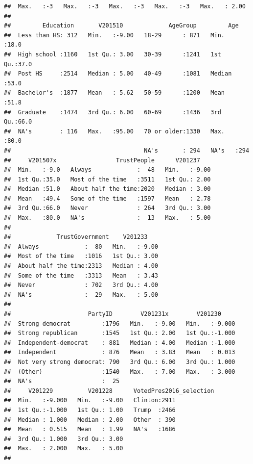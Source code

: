 \documentclass[
]{krantz}
\begin{document}
\begin{verbatim}
##  Max.   :-3   Max.   :-3   Max.   :-3   Max.   :-3   Max.   : 2.00  
##                                                                     
##         Education       V201510             AgeGroup         Age      
##  Less than HS: 312   Min.   :-9.00   18-29      : 871   Min.   :18.0  
##  High school :1160   1st Qu.: 3.00   30-39      :1241   1st Qu.:37.0  
##  Post HS     :2514   Median : 5.00   40-49      :1081   Median :53.0  
##  Bachelor's  :1877   Mean   : 5.62   50-59      :1200   Mean   :51.8  
##  Graduate    :1474   3rd Qu.: 6.00   60-69      :1436   3rd Qu.:66.0  
##  NA's        : 116   Max.   :95.00   70 or older:1330   Max.   :80.0  
##                                      NA's       : 294   NA's   :294   
##     V201507x                 TrustPeople      V201237     
##  Min.   :-9.0   Always             :  48   Min.   :-9.00  
##  1st Qu.:35.0   Most of the time   :3511   1st Qu.: 2.00  
##  Median :51.0   About half the time:2020   Median : 3.00  
##  Mean   :49.4   Some of the time   :1597   Mean   : 2.78  
##  3rd Qu.:66.0   Never              : 264   3rd Qu.: 3.00  
##  Max.   :80.0   NA's               :  13   Max.   : 5.00  
##                                                           
##             TrustGovernment    V201233     
##  Always             :  80   Min.   :-9.00  
##  Most of the time   :1016   1st Qu.: 3.00  
##  About half the time:2313   Median : 4.00  
##  Some of the time   :3313   Mean   : 3.43  
##  Never              : 702   3rd Qu.: 4.00  
##  NA's               :  29   Max.   : 5.00  
##                                            
##                      PartyID        V201231x        V201230      
##  Strong democrat         :1796   Min.   :-9.00   Min.   :-9.000  
##  Strong republican       :1545   1st Qu.: 2.00   1st Qu.:-1.000  
##  Independent-democrat    : 881   Median : 4.00   Median :-1.000  
##  Independent             : 876   Mean   : 3.83   Mean   : 0.013  
##  Not very strong democrat: 790   3rd Qu.: 6.00   3rd Qu.: 1.000  
##  (Other)                 :1540   Max.   : 7.00   Max.   : 3.000  
##  NA's                    :  25                                   
##     V201229          V201228      VotedPres2016_selection
##  Min.   :-9.000   Min.   :-9.00   Clinton:2911           
##  1st Qu.:-1.000   1st Qu.: 1.00   Trump  :2466           
##  Median : 1.000   Median : 2.00   Other  : 390           
##  Mean   : 0.515   Mean   : 1.99   NA's   :1686           
##  3rd Qu.: 1.000   3rd Qu.: 3.00                          
##  Max.   : 2.000   Max.   : 5.00                          
##                                                          

\end{verbatim}
\end{document}
